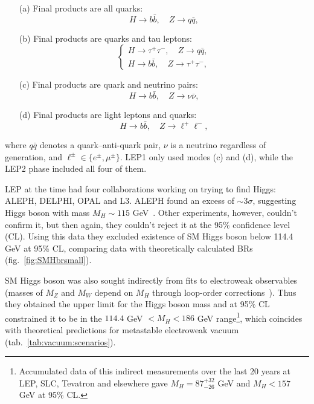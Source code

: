 \begin{itemize}
	\item[(a)] Final products are all quarks:
		\[ H \to b\bar{b}, \quad Z \to q\bar{q}, \] \vspace{-32pt}
	\item[(b)] Final products are quarks and tau leptons:
		\[ \left\{\begin{matrix}
		H \to \tau^+\tau^-, \quad Z \to q\bar{q}, \\
		H \to b\bar{b}, \quad Z \to \tau^+\tau^-,
		\end{matrix}\right.\] \vspace{-22pt}
	\item[(c)] Final products are quark and neutrino pairs:
		\[ H \to b\bar{b}, \quad Z \to \nu\bar{\nu}, \] \vspace{-32pt}
	\item[(d)] Final products are light leptons and quarks:
		\[ H \to b\bar{b}, \quad Z \to \ell^+\ell^-, \] \vspace{-32pt} \label{higgs:decay}
\end{itemize}

where $q\bar{q}$ denotes a quark--anti-quark pair, $\nu$ is a neutrino regardless of generation, and $\ell^\pm \in \{e^\pm,\mu^\pm\}$.
LEP1 only used modes (c) and (d), while the LEP2 phase included all four of them.

LEP at the time had four collaborations working on trying to find Higgs: ALEPH, DELPHI, OPAL and L3. ALEPH found an excess of
$\sim 3 \sigma$, suggesting Higgs boson with mass $M_H \sim 115$ GeV~\cite{higgs:review}. Other experiments, however, couldn't confirm it, but then
again, they couldn't reject it at the 95\% confidence level (CL). Using this data they excluded existence of
SM Higgs boson below 114.4 GeV at 95\% CL, comparing data with theoretically calculated BRs (fig.~\ref{fig:SMHbrsmall}).

\vspace{12pt}

SM Higgs boson was also sought indirectly from fits to electroweak observables~\cite{higgs:review} (masses of $M_Z$ and $M_W$ depend on $M_H$
through loop-order corrections~\cite{higgs:review}). Thus they obtained the upper limit
for the Higgs boson mass and at 95\% CL constrained it to be in the $114.4$ GeV $< M_H < 186$ GeV range\footnote{Accumulated data of this
indirect measurements over the last 20 years at LEP, SLC, Tevatron and elsewhere gave $M_H = 87^{+32}_{-26}$ GeV and $M_H < 157$ GeV at 95\% CL.},
which coincides with theoretical predictions for metastable electroweak vacuum (tab.~\ref{tab:vacuum:scenarios}).

